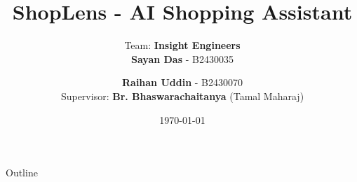 \title{ShopLens - AI Shopping Assistant}
\author{Team: \textbf{Insight Engineers} \\  \textbf{Sayan Das} - B2430035 \and \textbf{Raihan Uddin} - B2430070 \\ Supervisor: \textbf{Br. Bhaswarachaitanya} (Tamal Maharaj)}
\date{\today}


\maketitle

\begin{frame}{Outline}
  \tableofcontents
\end{frame}








